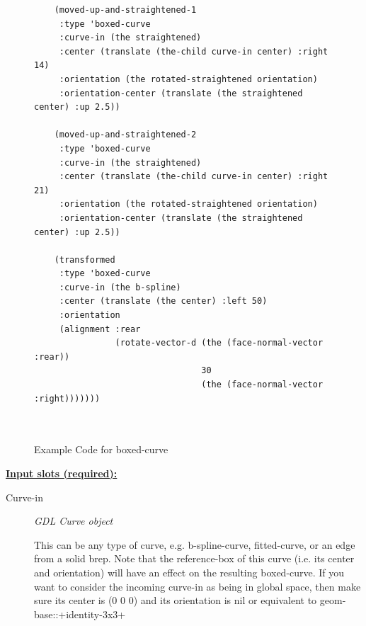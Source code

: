 \documentclass [11pt]{book}
\begin{document}
\begin{itemize}
\begin{figure}
\begin{lrbox}{\boxedverb}
\begin{minipage}{\linewidth}
{\begin{verbatim}
    (moved-up-and-straightened-1 
     :type 'boxed-curve
     :curve-in (the straightened)
     :center (translate (the-child curve-in center) :right 14)
     :orientation (the rotated-straightened orientation)
     :orientation-center (translate (the straightened center) :up 2.5))
    
    (moved-up-and-straightened-2 
     :type 'boxed-curve
     :curve-in (the straightened)
     :center (translate (the-child curve-in center) :right 21)
     :orientation (the rotated-straightened orientation)
     :orientation-center (translate (the straightened center) :up 2.5))
   
    (transformed 
     :type 'boxed-curve
     :curve-in (the b-spline)
     :center (translate (the center) :left 50)
     :orientation 
     (alignment :rear 
                (rotate-vector-d (the (face-normal-vector :rear))
                                 30
                                 (the (face-normal-vector :right)))))))
  
 
\end{verbatim}}
\end{minipage}
\end{lrbox}
\fbox{\usebox{\boxedverb}}

\caption{Example Code for boxed-curve}

\label{fig:example-code-boxed-curve}

\end{figure}





\textbf{
\underline{Input slots (required):}}

\begin{description}

\item [Curve-in]
\emph{GDL Curve object}

 This can be any type of curve, e.g. b-spline-curve, fitted-curve, or an edge from a solid brep.
Note that the reference-box of this curve (i.e. its center and orientation) will have an effect on the resulting
boxed-curve. If you want to consider the incoming curve-in as being in global space, then make sure its center
is (0 0 0) and its orientation is nil or equivalent to geom-base::+identity-3x3+




\end{description}







\end{itemize}
\end{document}
